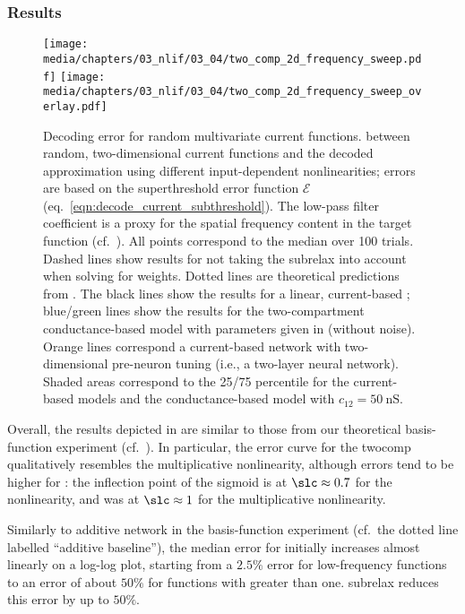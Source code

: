 \subsubsection{Results}

\begin{figure}
	\centering
	\texttt{[image: media/chapters/03\_nlif/03\_04/two\_comp\_2d\_frequency\_sweep.pdf]}%
	\kern-158.06mm\texttt{[image: media/chapters/03\_nlif/03\_04/two\_comp\_2d\_frequency\_sweep\_overlay.pdf]}
	\caption[Two-compartment neuron decoding error for random multivariate current functions]{Decoding error for random multivariate current functions.
	\NRMSE between random, two-dimensional current functions and the decoded approximation using different input-dependent nonlinearities; errors are based on the superthreshold error function $\mathcal{E}$ (eq.~\ref{eqn:decode_current_subthreshold}). The low-pass filter coefficient \slc is a proxy for the spatial frequency content in the target function (cf.~). All points correspond to the median over \num{100} trials. Dashed lines show results for not taking the \gls{subrelax} into account when solving for weights.
	Dotted lines are theoretical predictions from .	
	The black lines show the results for a linear, current-based \Hcur; blue/green lines show the results for the two-compartment conductance-based model  \Hcond with parameters given in  (without noise). Orange lines correspond a current-based network with two-dimensional pre-neuron tuning (i.e., a two-layer neural network). Shaded areas correspond to the 25/75 percentile for the current-based models and the conductance-based model with $c_{12} = \SI{50}{\nano\siemens}$.
	}
	\label{fig:two_comp_lif_frequency_sweep}
\end{figure}

Overall, the results depicted in  are similar to those from our theoretical basis-function experiment  (cf.~).
In particular, the error curve for the \gls{twocomp} qualitatively resembles the multiplicative nonlinearity, although errors tend to be higher for \Hcond:
the inflection point of the sigmoid is at $\slc \approx 0.7$ for the \twocomplif nonlinearity, and was at $\slc \approx 1$ for the multiplicative nonlinearity.

Similarly to additive network in the basis-function experiment (cf.~the dotted line labelled \enquote{additive baseline}), the median error for \Hcur initially increases almost linearly on a log-log plot, starting from a $2.5\%$ error for low-frequency functions to an error of about $50\%$ for functions with \slc greater than one.
\Gls{subrelax} reduces this error by up to $50\%$.

